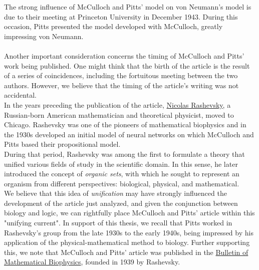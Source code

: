 \documentclass[10pt]{article}
\begin{document}
The strong influence of McCulloch and Pitts' model on von Neumann's model is due to their meeting at Princeton University in December 1943. During this occasion, Pitts presented the model developed with McCulloch, greatly impressing von Neumann.\\
\\
Another important consideration concerns the timing of McCulloch and Pitts' work being published. One might think that the birth of the article is the result of a series of coincidences, including the fortuitous meeting between the two authors. However, we believe that the timing of the article's writing was not accidental.\\
In the years preceding the publication of the article, \href{https://en.wikipedia.org/wiki/Nicolas_Rashevsky}{Nicolas Rashevsky}, a Russian-born American mathematician and theoretical physicist, moved to Chicago. Rashevsky was one of the pioneers of mathematical biophysics and in the 1930s developed an initial model of neural networks on which McCulloch and Pitts based their propositional model.\\
During that period, Rashevsky was among the first to formulate a theory that unified various fields of study in the scientific domain. In this sense, he later introduced the concept of \emph{organic sets}\cite{Rashevsky1967}, with which he sought to represent an organism from different perspectives: biological, physical, and mathematical.\\
We believe that this idea of \emph{unification} may have strongly influenced the development of the article just analyzed, and given the conjunction between biology and logic, we can rightfully place McCulloch and Pitts' article within this "unifying current". In support of this thesis, we recall that Pitts worked in Rashevsky's group from the late 1930s to the early 1940s, being impressed by his application of the physical-mathematical method to biology. Further supporting this, we note that McCulloch and Pitts' article was published in the \href{https://en.wikipedia.org/wiki/Society_for_Mathematical_Biology}{Bulletin of Mathematical Biophysics}, founded in 1939 by Rashevsky.
\end{document}
